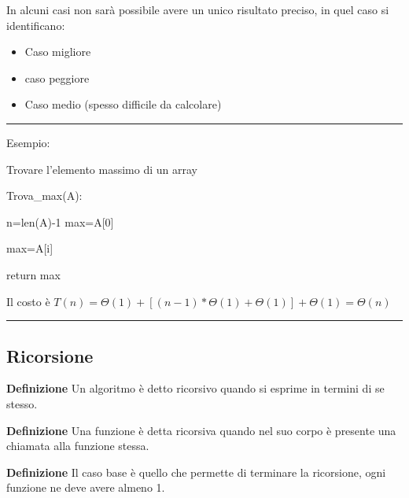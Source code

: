 \documentclass{article}
\begin{document}
\noindent In alcuni casi non sarà possibile avere un unico risultato preciso, in quel caso si identificano:
\begin{itemize}
    \item Caso migliore
    \item caso peggiore
    \item Caso medio (spesso difficile da calcolare)\newline
\end{itemize}

\noindent\rule{\textwidth}{0.5pt}\newline

\noindent Esempio:\newline

\begin{algorithm}[ht]
\caption{Trovare l'elemento massimo di un array}
\begin{algorithmic}
\State Trova\_max(A):

    \State n=len(A)-1 
    \State max=A[0] 

     

         

            \State max=A[i] 

        \EndIf
    \EndFor

\State return max 

\end{algorithmic}
\end{algorithm}

\noindent Il costo è $T(n)=\Theta(1)+[(n-1)*\Theta(1)+\Theta(1)]+\Theta(1)=\Theta(n)$

\noindent\rule{\textwidth}{0.5pt}\newline

\subsection{Ricorsione}

\textbf{Definizione} Un algoritmo è detto ricorsivo quando si esprime in termini di se stesso.\newline

\noindent\textbf{Definizione} Una funzione è detta ricorsiva quando nel suo corpo è presente una chiamata alla funzione stessa.\newline

\noindent\textbf{Definizione} Il caso base è quello che permette di terminare la ricorsione, ogni funzione ne deve avere almeno 1.\newline
\end{document}
